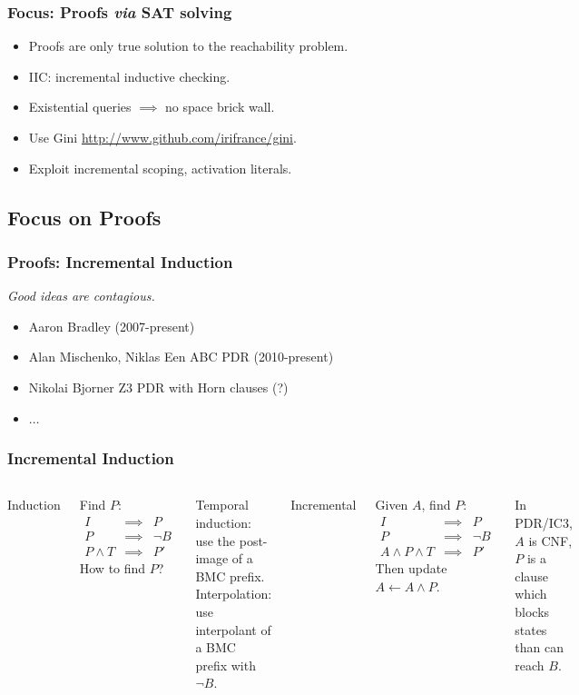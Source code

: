 \documentclass{beamer}
\begin{document}
\begin{frame}
	\frametitle{Focus: Proofs {\em via} SAT solving}
	\begin{itemize}
		\item Proofs are only true solution to the reachability problem.
		\item IIC: incremental inductive checking.
		\item Existential queries $\implies$ no space brick wall.
		\item Use Gini \url{http://www.github.com/irifrance/gini}.
		\item Exploit incremental scoping, activation literals.
	\end{itemize}
\end{frame}


\subsection{Focus on Proofs}
\begin{frame}
	\frametitle{Proofs: Incremental Induction}
	\begin{center}
		\em{Good ideas are contagious.}
	\end{center}
	\begin{itemize}
		\item Aaron Bradley (2007-present)
		\item Alan Mischenko, Niklas Een ABC PDR (2010-present)
		\item Nikolai Bjorner Z3 PDR with Horn clauses (?)
		\item $\ldots$
	\end{itemize}
\end{frame}

\begin{frame}
	\frametitle{Incremental Induction}
	\begin{columns}
		\begin{center}Induction\end{center}
		Find $P$:
		\begin{align*}
			I & \implies & P\\
			P & \implies & \neg B\\
			P \wedge T & \implies & P'
		\end{align*}
		How to find $P$?

		Temporal induction: use the post-image of a BMC prefix.\\
		Interpolation: use interpolant of a BMC prefix with $\neg B$.
		\begin{center}Incremental\end{center}
		Given $A$, find $P$:
		\begin{align*}
			I & \implies & P\\
			P & \implies & \neg B\\
			A \wedge P \wedge T & \implies & P'
		\end{align*}
		Then update $A \leftarrow A \wedge P$.

		In PDR/IC3, $A$ is CNF, $P$ is a clause which blocks
		states than can reach $B$.
	\end{columns}
\end{frame}
\end{document}
